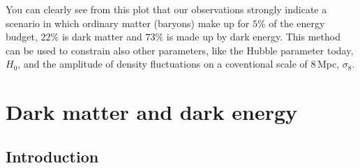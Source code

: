 \documentclass[11pt, a4paper,oneside,openright]{book}
\numberwithin{equation}{section}
\begin{document}
You can clearly see from this plot that our observations strongly indicate a scenario in which ordinary matter (baryons) make up for $5\%$ of the energy budget, $22\%$ is dark matter and $73\%$ is made up by dark energy. This method can be used to constrain also other parameters, like the Hubble parameter today, $H_0$, and the amplitude of density fluctuations on a coventional scale of 8\,Mpc, $\sigma_8$.


\chapter{Dark matter and dark energy}

\section{Introduction}
\end{document}

